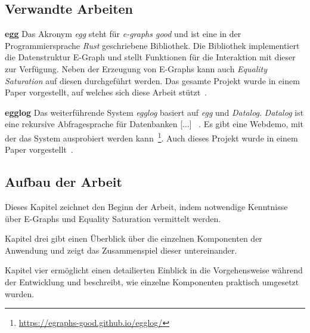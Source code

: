 \subsection{Verwandte Arbeiten}\label{sub:verwandtearbeiten}

\noindent\textbf{egg} Das Akronym \textit{egg} steht für \textit{e-graphs good} und ist eine in der Programmiersprache \textit{Rust} geschriebene Bibliothek.
Die Bibliothek implementiert die Datenstruktur E-Graph und stellt Funktionen für die Interaktion mit dieser zur Verfügung.
Neben der Erzeugung von E-Graphs kann auch \textit{Equality Saturation} auf diesen durchgeführt werden.
Das gesamte Projekt wurde in einem Paper vorgestellt, auf welches sich diese Arbeit stützt~\cite{2021-egg}.

\noindent\textbf{egglog} Das weiterführende System \textit{egglog} basiert auf \textit{egg} und \textit{Datalog}. 
\textit{Datalog} ist eine \glqq [...] rekursive Abfragesprache für Datenbanken [...] \grqq~\cite{2023-egglog}.
Es gibt eine Webdemo, mit der das System ausprobiert werden kann~\footnote{\hspace{1.5mm}\url{https://egraphs-good.github.io/egglog/}}.
Auch dieses Projekt wurde in einem Paper vorgestellt~\cite{2023-egglog}.


\subsection{Aufbau der Arbeit}

\vspace{-2mm}

Dieses Kapitel zeichnet den Beginn der Arbeit, indem notwendige Kenntnisse über E-Graphs und Equality Saturation vermittelt werden.
\vspace{6mm}

\vspace{-2mm}

Kapitel drei gibt einen Überblick über die einzelnen Komponenten der Anwendung und zeigt das Zusammenspiel dieser untereinander.
\vspace{6mm}

\vspace{-2mm}

Kapitel vier ermöglicht einen detailierten Einblick in die Vorgehensweise während der Entwicklung und beschreibt, wie einzelne Komponenten praktisch umgesetzt wurden.
\vspace{6mm}

